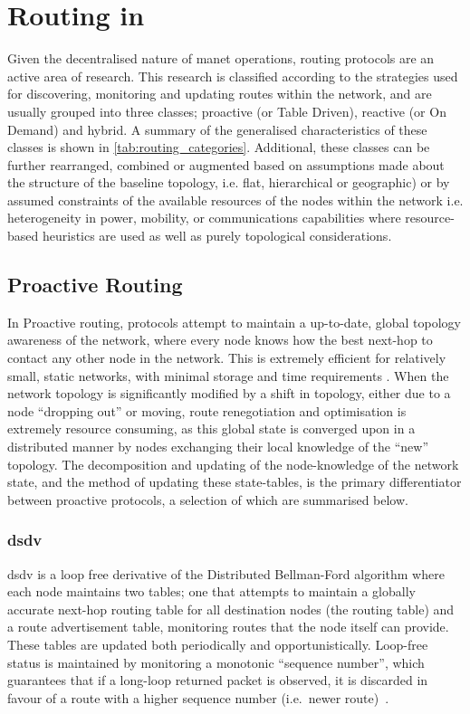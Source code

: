 \section{Routing in }\label{sec:manet_routing}

Given the decentralised nature of \gls{manet} operations, routing protocols are an active area of research. 
This research is classified according to the strategies used for discovering, monitoring and updating routes within the network, and are usually grouped into three classes; proactive (or Table Driven), reactive (or On Demand) and hybrid.
A summary of the generalised characteristics of these classes is shown in \autoref{tab:routing_categories}.
Additional, these classes can be further rearranged, combined or augmented based on assumptions made about the structure of the baseline topology, i.e. flat, hierarchical or geographic) or by assumed constraints of the available resources of the nodes within the network i.e. heterogeneity in power, mobility, or communications capabilities where resource-based heuristics are used as well as purely topological considerations\cite{Li2005,Gerla2002}.

\subsection{Proactive Routing}

In Proactive routing, protocols attempt to maintain a up-to-date, global topology awareness of the network, where every node knows how the best next-hop to contact any other node in the network.
This is extremely efficient for relatively small, static networks, with minimal storage and time requirements \cite{}.
When the network topology is significantly modified by a shift in topology, either due to a node ``dropping out'' or moving, route renegotiation and optimisation is extremely resource consuming, as this global state is converged upon in a distributed manner by nodes exchanging their local knowledge of the ``new'' topology.
The decomposition and updating of the node-knowledge of the network state, and the method of updating these state-tables, is the primary differentiator between proactive protocols, a selection of which are summarised below.

\subsubsection{\gls{dsdv}}
\acrlong{dsdv} is a loop free derivative of the Distributed Bellman-Ford algorithm where each node maintains two tables; one that attempts to maintain a globally accurate next-hop routing table for all destination nodes (the routing table) and a route advertisement table, monitoring routes that the node itself can provide. These tables are updated both periodically and opportunistically. Loop-free status is maintained by monitoring a monotonic ``sequence number'', which guarantees that if a long-loop returned packet is observed, it is discarded in favour of a route with a higher sequence number (i.e.\ newer route)~\cite{Perkins1994}.\
